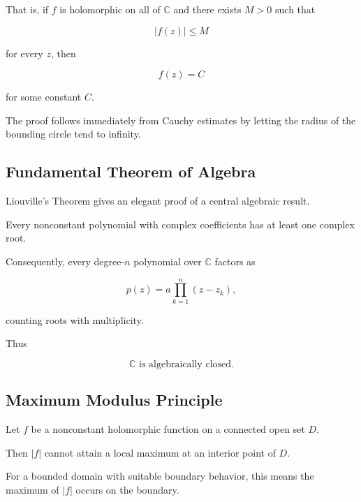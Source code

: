 That is, if \(f\) is holomorphic on all of \(\mathbb{C}\) and there exists
\(M>0\) such that

\[
|f(z)|\leq M
\]

for every \(z\), then

\[
\boxed{
f(z)=C
}
\]

for some constant \(C\).

The proof follows immediately from Cauchy estimates by letting the radius
of the bounding circle tend to infinity.

\subsection{Fundamental Theorem of Algebra}
\label{subsec:fundamental-theorem-algebra-complex}

Liouville's Theorem gives an elegant proof of a central algebraic result.

\begin{theorem}
Every nonconstant polynomial with complex coefficients has at least one
complex root.
\end{theorem}

Consequently, every degree-\(n\) polynomial over \(\mathbb{C}\) factors as

\[
\boxed{
p(z)
=
a
\prod_{k=1}^{n}(z-z_k),
}
\]

counting roots with multiplicity.

Thus

\[
\boxed{
\mathbb{C}
\text{ is algebraically closed}.
}
\]

\subsection{Maximum Modulus Principle}
\label{subsec:maximum-modulus-principle}

\begin{theorem}
Let \(f\) be a nonconstant holomorphic function on a connected open set
\(D\).

Then \(|f|\) cannot attain a local maximum at an interior point of \(D\).
\end{theorem}

For a bounded domain with suitable boundary behavior, this means the
maximum of \(|f|\) occurs on the boundary.

